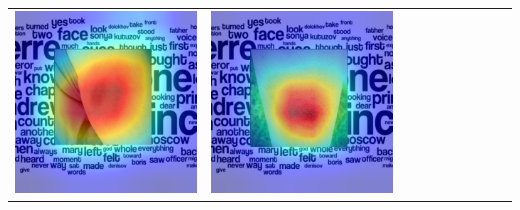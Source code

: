 \begin{landscape}
\begin{table}[]
\begin{tabular}{@{}c c c c c c c c c c@{}}
			\includegraphics[width=.12\textheight ,keepaspectratio]{images/pretraining/gradcam/3/InceptionResNetV2CombinedGradCam.png} &
			\includegraphics[width=.12\textheight ,keepaspectratio]{images/pretraining/gradcam/9/InceptionResNetV2CombinedGradCam.png} &

\end{tabular}
\end{table}
\end{landscape}
